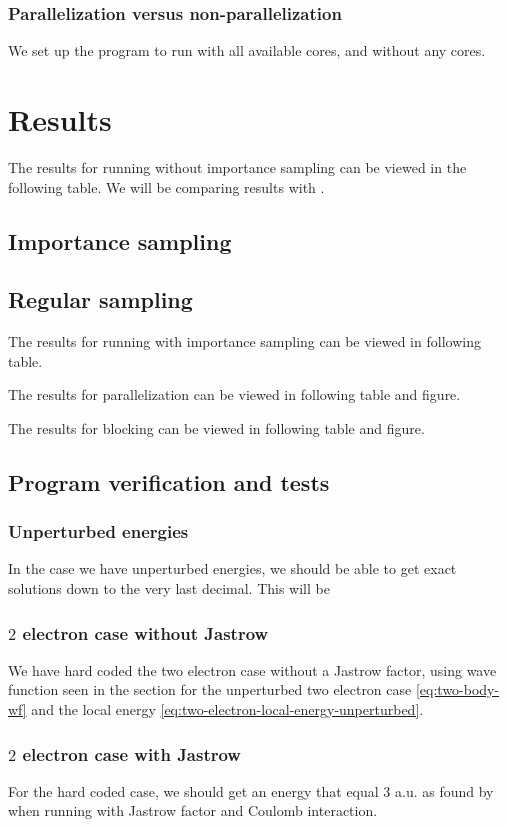 \documentclass[11pt]{article}
\begin{document}
\subsubsection{Parallelization versus non-parallelization}
We set up the program to run with all available cores, and without any cores.
\section{Results}
The results for running without importance sampling can be viewed in the following table. We will be comparing results with \citet{PhysRevB.84.115302}.
\subsection{Importance sampling}
\subsection{Regular sampling}

The results for running with importance sampling can be viewed in following table.

The results for parallelization can be viewed in following table and figure.

The results for blocking can be viewed in following table and figure.

\subsection{Program verification and tests}
\subsubsection{Unperturbed energies}
In the case we have unperturbed energies, we should be able to get exact solutions down to the very last decimal. This will be 

\subsubsection{\texorpdfstring{$2$}{a} electron case without Jastrow}
We have hard coded the two electron case without a Jastrow factor, using wave function seen in the section for the unperturbed two electron case \eqref{eq:two-body-wf} and the local energy \eqref{eq:two-electron-local-energy-unperturbed}.

\subsubsection{\texorpdfstring{$2$}{a} electron case with Jastrow}
For the hard coded case, we should get an energy that equal 3 a.u. as found by \citet{PhysRevA.48.3561} when running with Jastrow factor and Coulomb interaction.
\end{document}
